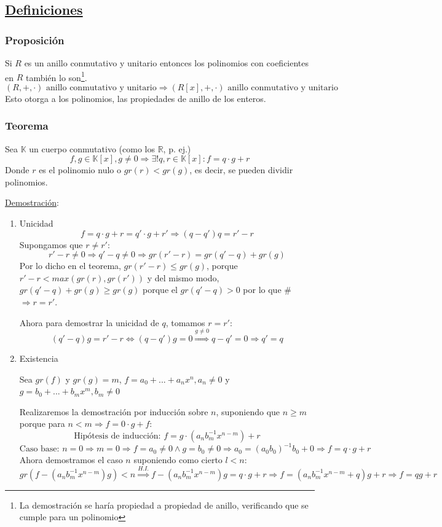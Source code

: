 \documentclass[10pt,a4paper,openright]{book}
\begin{document}
\subsection*{\underline {Definiciones}}
\subsubsection*{Proposición}
Si $R$ es un anillo conmutativo y unitario entonces los polinomios con coeficientes en $R$ también lo son\footnote{La demostración se haría propiedad a propiedad de anillo, verificando que se cumple para un polinomio}.
$$(R,+,\cdot)\mbox{ anillo conmutativo y unitario} \Rightarrow (R[x],+,\cdot) \mbox{ anillo conmutativo y unitario}$$
Esto otorga a los polinomios, las propiedades de anillo de los enteros.

\subsubsection*{Teorema}
Sea $\mathbb K$ un cuerpo conmutativo (como los $\mathbb R$, p. ej.)
$$f,g \in \mathbb K[x], g\neq 0 \Rightarrow \exists!q,r\in \mathbb K[x] : f=q\cdot g+r$$ 
Donde $r$ es el polinomio nulo o $gr(r)<gr(g)$, es decir, se pueden dividir polinomios.\par
\underline{Demostración}:
\begin{enumerate}
\item Unicidad
$$f=q\cdot g+r= q'\cdot g+r'\Rightarrow (q-q')q=r'-r$$
Supongamos que $r\neq r'$:
$$r'-r\neq 0\Rightarrow q'-q\neq 0 \Rightarrow gr(r'-r)=gr(q'-q)+gr(g)$$
Por lo dicho en el teorema, $gr(r'-r)\leq gr(g)$, porque $r'-r<max\left( gr(r),gr(r')\right)$ y del mismo modo, $gr(q'-q)+gr(g)\geq gr(g)$ porque el $gr(q'-q)>0$ por lo que \# $\Rightarrow r=r'$.\par
Ahora para demostrar la unicidad de $q$, tomamos $r=r'$:
$$(q'-q)g=r'-r\Leftrightarrow (q-q')g=0\stackrel{g\neq 0}{\Rightarrow }q-q'=0\Rightarrow q'=q$$

\item Existencia\par
Sea $gr(f)$ y $gr(g)=m$, $f=a_0+...+a_nx^n, a_n\neq 0$ y $g=b_0+...+b_mx^m, b_m\neq 0$\par
Realizaremos la demostración por inducción sobre $n$, suponiendo que $n\geq m$ porque para $n<m\Rightarrow f=0\cdot g +f$:
$$\mbox{Hipótesis de inducción: } f=g\cdot (a_nb_m^{-1}x^{n-m})+r$$
$$\mbox{Caso base: }n=0\Rightarrow m=0\Rightarrow f=a_0\neq 0 \wedge g=b_0\neq 0\Rightarrow a_0=(a_0b_0)^{-1}b_0+0\Rightarrow f=q\cdot g+ r$$
Ahora demostramos el caso $n$ suponiendo como cierto $l<n$:
$$gr(f-(a_nb_m^{-1}x^{n-m})g)<n\stackrel{H.I.}{\Rightarrow}f-(a_nb_m^{-1}x^{n-m})g=q\cdot g+r\Rightarrow f=(a_nb_m^{-1}x^{n-m}+q)g+r\Rightarrow f=qg+r$$
\end{enumerate}
\end{document}
